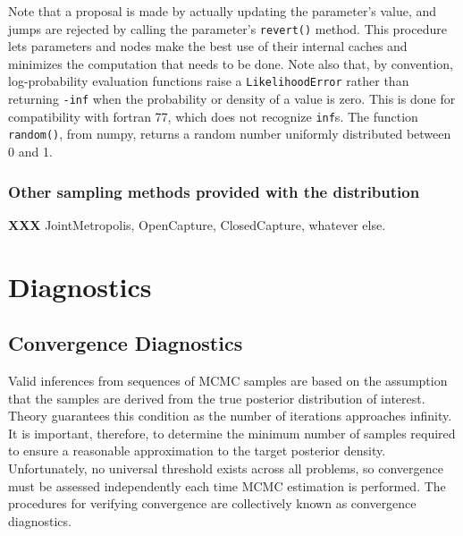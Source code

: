 \documentclass[]{book}
\begin{document}
Note that a proposal is made by actually updating the parameter's value, and jumps are rejected by calling the parameter's \texttt{revert()} method. This procedure lets parameters and nodes make the best use of their internal caches and minimizes the computation that needs to be done. Note also that, by convention, log-probability evaluation functions raise a \texttt{LikelihoodError} rather than returning \texttt{-inf} when the probability or density of a value is zero. This is done for compatibility with fortran 77, which does not recognize \texttt{inf}s. The function \texttt{random()}, from numpy, returns a random number uniformly distributed between 0 and 1.


\subsection{Other sampling methods provided with the distribution}\label{sub:other_sm}
\textbf{XXX} JointMetropolis, OpenCapture, ClosedCapture, whatever else.







\chapter{Diagnostics} %

\section{Convergence Diagnostics}

Valid inferences from sequences of MCMC samples are based on the assumption that the samples are derived from the true posterior distribution of interest. Theory guarantees this condition as the number of iterations approaches infinity. It is important, therefore, to determine the minimum number of samples required to ensure a reasonable approximation to the target posterior density. Unfortunately, no universal threshold exists across all problems, so convergence must be assessed independently each time MCMC estimation is performed. The procedures for verifying convergence are collectively known as convergence diagnostics.
\end{document}
